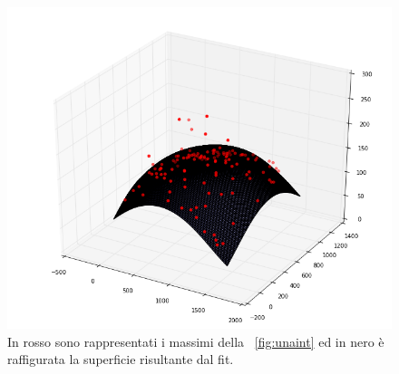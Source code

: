 \begin{figure}
 \centering
 \includegraphics[scale=0.50]{img/CAP3gauss.png}
 \caption{\small{In rosso sono rappresentati i massimi della \figurename~\ref{fig:unaint} ed in nero è raffigurata la superficie risultante dal fit.}}
 \label{fig:gauss}
\end{figure}

